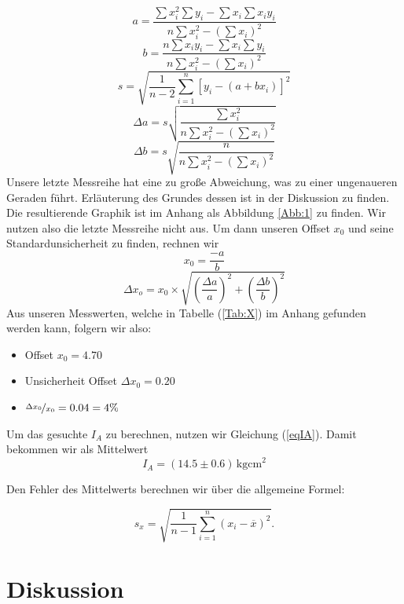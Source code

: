 \documentclass[11pt,a4paper]{article}
\begin{document}
\begin{equation}
a=\frac{\sum x_i^2\sum y_i-\sum x_i\sum x_iy_i}{n\sum x_i^2-(\sum x_i)^2}
\end{equation}
\begin{equation}
b=\frac{n\sum x_iy_i-\sum x_i\sum y_i}{n\sum x_i^2-(\sum x_i)^2}
\end{equation}
\begin{equation}
s=\sqrt{\frac{1}{n-2}\sum^n_{i=1}[y_i-(a+bx_i)]^2}
\end{equation}
\begin{equation}
\Delta a=s\sqrt{\frac{\sum x_i^2}{n\sum x_i^2-(\sum x_i)^2}}
\end{equation}
\begin{equation}
\Delta b=s\sqrt{\frac{n}{n\sum x_i^2-(\sum x_i)^2}}
\end{equation}
Unsere letzte Messreihe hat eine zu gro\ss e Abweichung, was zu einer ungenaueren Geraden f\"uhrt. Erl\"auterung des Grundes dessen ist in der Diskussion zu finden. Die resultierende Graphik ist im Anhang als Abbildung \ref{Abb:1} zu finden. Wir nutzen also die letzte Messreihe nicht aus.
Um dann unseren Offset $x_0$ und seine Standardunsicherheit zu finden, rechnen wir
\[
x_0=\frac{-a}{b}
\]
\[
\Delta x_o=x_0\times\sqrt{\left(\frac{\Delta a}{a}\right)^2+\left(\frac{\Delta b}{b}\right)^2}
\]
Aus unseren Messwerten, welche in Tabelle (\ref{Tab:X}) im Anhang gefunden werden kann, folgern wir also:
\begin{itemize}
\item Offset $x_0=4.70$
\item Unsicherheit Offset $\Delta x_0=0.20$
\item $\nicefrac{\Delta x_0}{x_0}=0.04=4\%$
\end{itemize}

Um das gesuchte $I_A$ zu berechnen, nutzen wir Gleichung (\ref{eqIA}). Damit bekommen wir als Mittelwert
\[
I_A=(14.5\pm0.6)\,\mathrm{kgcm}^2
\]

Den Fehler des Mittelwerts berechnen wir \"uber die allgemeine Formel:

\begin{equation}
s_x=\sqrt{\frac{1}{n-1}\sum_{i=1}^n(x_i-\overline{x})^2}.\label{uncertainty1}
\end{equation}

\section{Diskussion}
\end{document}
